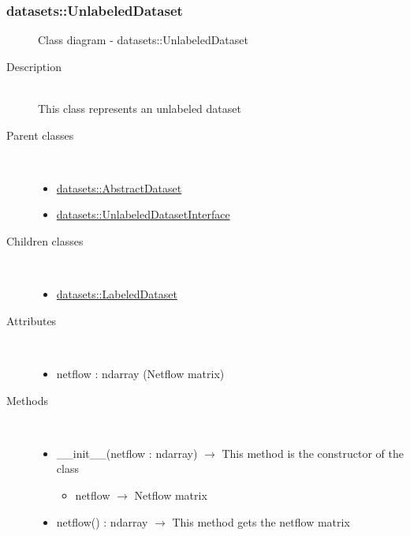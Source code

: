 \subsubsection[UnlabeledDataset]{datasets::UnlabeledDataset}
\begin{figure}[h]
\centering
{}
\caption{Class diagram - datasets::UnlabeledDataset}
\end{figure}\begin{description}
\item[Description] \hfill \\
 This class represents an unlabeled dataset
\item[Parent classes] \hfill \\
 \vspace{-1cm}
\begin{itemize}
\item \hyperlink{datasets::AbstractDataset}{datasets::AbstractDataset}
\item \hyperlink{datasets::UnlabeledDatasetInterface}{datasets::UnlabeledDatasetInterface}
\end{itemize}

\item[Children classes] \hfill \\
 \vspace{-1cm}
\begin{itemize}
\item \hyperlink{datasets::LabeledDataset}{datasets::LabeledDataset}
\end{itemize}

\item[Attributes] \hfill \\
 \vspace{-1cm}
\begin{itemize}
\item netflow : ndarray (Netflow matrix)
\end{itemize}

\item[Methods] \hfill \\
 \vspace{-1cm}
\begin{itemize}
\item \_\_init\_\_(netflow : ndarray) $\rightarrow$ This method is the constructor of the class\begin{itemize}
\item netflow $\rightarrow$ Netflow matrix
\end{itemize}

\item netflow() : ndarray $\rightarrow$ This method gets the netflow matrix
\end{itemize}

\end{description}
\hypertarget{datasets::LabeledDataset}{}

